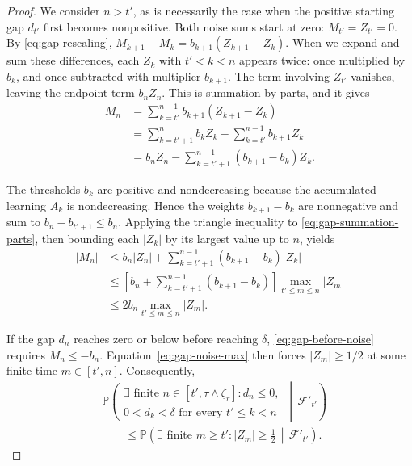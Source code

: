 \begin{proof}
We consider $n>t'$, as is necessarily the case when the positive starting gap $d_{t'}$ first becomes nonpositive. Both noise sums start at zero: $M_{t'}=Z_{t'}=0$. By \eqref{eq:gap-rescaling}, $M_{k+1}-M_k=b_{k+1}(Z_{k+1}-Z_k)$. When we expand and sum these differences, each $Z_k$ with $t'<k<n$ appears twice: once multiplied by $b_k$, and once subtracted with multiplier $b_{k+1}$. The term involving $Z_{t'}$ vanishes, leaving the endpoint term $b_nZ_n$. This is summation by parts, and it gives
\begin{equation}
\begin{aligned}
M_n
&=\sum_{k=t'}^{n-1}b_{k+1}(Z_{k+1}-Z_k)\\
&=\sum_{k=t'+1}^{n}b_kZ_k
-\sum_{k=t'}^{n-1}b_{k+1}Z_k\\
&=b_nZ_n-\sum_{k=t'+1}^{n-1}(b_{k+1}-b_k)Z_k.
\end{aligned}
\label{eq:gap-summation-parts}
\end{equation}

The thresholds $b_k$ are positive and nondecreasing because the accumulated learning $A_k$ is nondecreasing. Hence the weights $b_{k+1}-b_k$ are nonnegative and sum to $b_n-b_{t'+1}\le b_n$. Applying the triangle inequality to \eqref{eq:gap-summation-parts}, then bounding each $|Z_k|$ by its largest value up to $n$, yields
\begin{equation}
\begin{aligned}
|M_n|
&\le b_n|Z_n|
+\sum_{k=t'+1}^{n-1}(b_{k+1}-b_k)|Z_k|\\
&\le
\left[b_n+\sum_{k=t'+1}^{n-1}(b_{k+1}-b_k)\right]
\max_{t'\le m\le n}|Z_m|\\
&\le2b_n\max_{t'\le m\le n}|Z_m|.
\end{aligned}
\label{eq:gap-noise-max}
\end{equation}

If the gap $d_n$ reaches zero or below before reaching $\delta$, \eqref{eq:gap-before-noise} requires $M_n\le-b_n$. Equation~\eqref{eq:gap-noise-max} then forces $|Z_m|\ge1/2$ at some finite time $m\in[t',n]$. Consequently,
\begin{equation}
\begin{aligned}
&\mathbb P\!\left(
\begin{array}{l}
\exists\text{ finite }n\in[t',\tau\wedge\zeta_r]:d_n\le0,\\
0<d_k<\delta\text{ for every }t'\le k<n
\end{array}
\,\middle|\,\mathcal F'_{t'}\right)\\
&\qquad\le
\mathbb P\!\left(\exists\text{ finite }m\ge t':|Z_m|\ge\tfrac12
\,\middle|\,\mathcal F'_{t'}\right).
\end{aligned}
\label{eq:gap-before-event}
\end{equation}


\end{proof}
